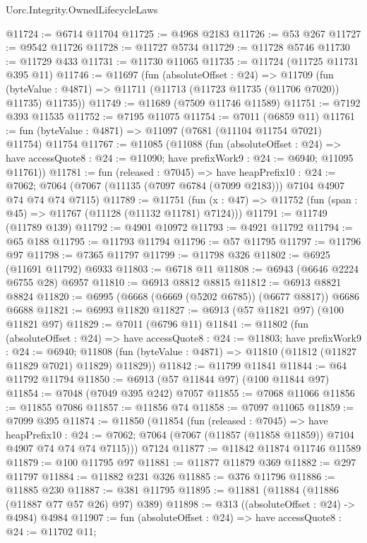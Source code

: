 \begin{lexlean}{Uorc.Integrity.OwnedLifecycleLaws}
\begin{coremodule}
@11724 := @6714 @11704
@11725 := @4968 @2183
@11726 := @53 @267
@11727 := @9542 @11726
@11728 := @11727 @5734
@11729 := @11728 @5746
@11730 := @11729 @433
@11731 := @11730 @11065
@11735 := @11724 (@11725 @11731 @395 @11)
@11746 := @11697
    (fun (absoluteOffset : @24) =>
    @11709
      (fun (byteValue : @4871) => @11711 (@11713 (@11723 @11735 (@11706 @7020)) @11735) @11735))
@11749 := @11689 (@7509 @11746 @11589)
@11751 := @7192 @393 @11535
@11752 := @7195 @11075
@11754 := @7011 (@6859 @11)
@11761 := fun (byteValue : @4871) => @11097 (@7681 (@11104 @11754 @7021) @11754) @11754
@11767 := @11085
    (@11088
      (fun (absoluteOffset : @24) =>
      have accessQuote8 : @24 := @11090; have prefixWork9 : @24 := @6940; @11095 @11761))
@11781 := fun (released : @7045) =>
  have heapPrefix10 : @24 := @7062;
  @7064 (@7067 (@11135 (@7097 @6784 (@7099 @2183))) @7104 @4907 @74 @74 @74 @7115)
@11789 := @11751
    (fun (x : @47) => @11752 (fun (span : @45) => @11767 (@11128 (@11132 @11781) @7124)))
@11791 := @11749 (@11789 @139)
@11792 := @4901 @10972
@11793 := @4921 @11792
@11794 := @65 @188
@11795 := @11793 @11794
@11796 := @57 @11795
@11797 := @11796 @97
@11798 := @7365 @11797
@11799 := @11798 @326
@11802 := @6925 (@11691 @11792) @6933
@11803 := @6718 @11
@11808 := @6943 (@6646 @2224 @6755 @28) @6957
@11810 := @6913 @8812 @8815
@11812 := @6913 @8821 @8824
@11820 := @6995 (@6668 (@6669 (@5202 @6785)) (@6677 @8817)) @6686 @6688
@11821 := @6993 @11820
@11827 := @6913 (@57 @11821 @97) (@100 @11821 @97)
@11829 := @7011 (@6796 @11)
@11841 := @11802
    (fun (absoluteOffset : @24) =>
    have accessQuote8 : @24 := @11803;
    have prefixWork9 : @24 := @6940;
    @11808 (fun (byteValue : @4871) => @11810 (@11812 (@11827 @11829 @7021) @11829) @11829))
@11842 := @11799 @11841
@11844 := @64 @11792 @11794
@11850 := @6913 (@57 @11844 @97) (@100 @11844 @97)
@11854 := @7048 (@7049 @395 @242) @7057
@11855 := @7068 @11066
@11856 := @11855 @7086
@11857 := @11856 @74
@11858 := @7097 @11065
@11859 := @7099 @395
@11874 := @11850
    (@11854
      (fun (released : @7045) =>
      have heapPrefix10 : @24 := @7062;
      @7064 (@7067 (@11857 (@11858 @11859)) @7104 @4907 @74 @74 @74 @7115)))
    @7124
@11877 := @11842 @11874 @11746 @11589
@11879 := @100 @11795 @97
@11881 := @11877 @11879 @369
@11882 := @297 @11797
@11884 := @11882 @231 @326
@11885 := @376 @11796
@11886 := @11885 @230
@11887 := @381 @11795
@11895 := @11881 (@11884 (@11886 (@11887 @77 @57 @26) @97) @389)
@11898 := @313 ((absoluteOffset : @24) -> @4984) @4984
@11907 := fun (absoluteOffset : @24) =>
  have accessQuote8 : @24 := @11702 @11;

\end{coremodule}
\end{lexlean}
